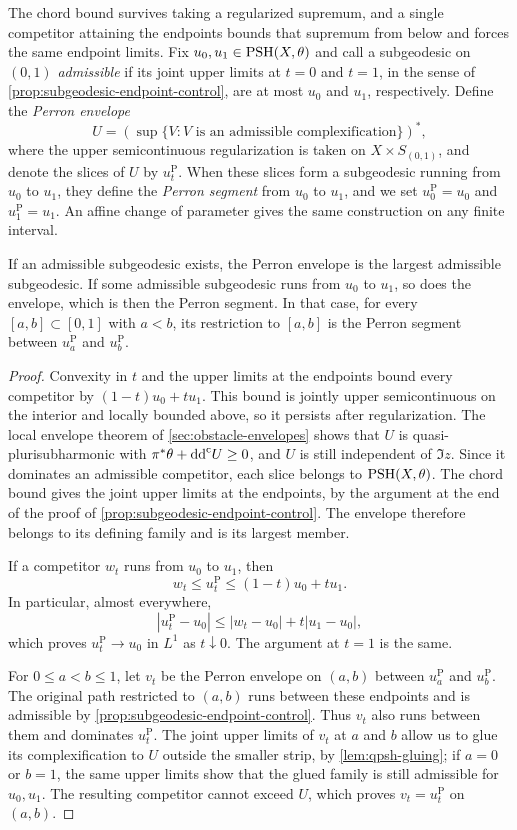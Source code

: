 The chord bound survives taking a regularized supremum, and a single competitor attaining the endpoints bounds that supremum from below and forces the same endpoint limits. Fix $u_0,u_1\in\mathrm{PSH}(X,\theta)$ and call a subgeodesic on $(0,1)$ \emph{admissible} if its joint upper limits at $t=0$ and $t=1$, in the sense of \cref{prop:subgeodesic-endpoint-control}, are at most $u_0$ and $u_1$, respectively. Define the \emph{Perron envelope}
\[
 U=\left(\sup\{V:V\text{ is an admissible complexification}\}\right)^*,
\]
where the upper semicontinuous regularization is taken on $X\times S_{(0,1)}$, and denote the slices of $U$ by $u_t^{\mathrm P}$. When these slices form a subgeodesic running from $u_0$ to $u_1$, they define the \emph{Perron segment} from $u_0$ to $u_1$, and we set $u_0^{\mathrm P}=u_0$ and $u_1^{\mathrm P}=u_1$. An affine change of parameter gives the same construction on any finite interval.

\begin{proposition}\label{prop:hermitian-perron}
If an admissible subgeodesic exists, the Perron envelope is the largest admissible subgeodesic. If some admissible subgeodesic runs from $u_0$ to $u_1$, so does the envelope, which is then the Perron segment. In that case, for every $[a,b]\subset[0,1]$ with $a<b$, its restriction to $[a,b]$ is the Perron segment between $u_a^{\mathrm P}$ and $u_b^{\mathrm P}$.
\end{proposition}
\begin{proof}
Convexity in $t$ and the upper limits at the endpoints bound every competitor by $(1-t)u_0+t u_1$. This bound is jointly upper semicontinuous on the interior and locally bounded above, so it persists after regularization. The local envelope theorem of \cref{sec:obstacle-envelopes} shows that $U$ is quasi-plurisubharmonic with $\pi^*\theta+\mathrm{dd}^{\mathrm{c}} U\geq0$, and $U$ is still independent of $\Im z$. Since it dominates an admissible competitor, each slice belongs to $\mathrm{PSH}(X,\theta)$. The chord bound gives the joint upper limits at the endpoints, by the argument at the end of the proof of \cref{prop:subgeodesic-endpoint-control}. The envelope therefore belongs to its defining family and is its largest member.

If a competitor $w_t$ runs from $u_0$ to $u_1$, then
\[
 w_t\leq u_t^{\mathrm P}\leq(1-t)u_0+t u_1.
\]
In particular, almost everywhere,
\[
 |u_t^{\mathrm P}-u_0|\leq |w_t-u_0|+t|u_1-u_0|,
\]
which proves $u_t^{\mathrm P}\to u_0$ in $L^1$ as $t\downarrow0$. The argument at $t=1$ is the same.

For $0\leq a<b\leq1$, let $v_t$ be the Perron envelope on $(a,b)$ between $u_a^{\mathrm P}$ and $u_b^{\mathrm P}$. The original path restricted to $(a,b)$ runs between these endpoints and is admissible by \cref{prop:subgeodesic-endpoint-control}. Thus $v_t$ also runs between them and dominates $u_t^{\mathrm P}$. The joint upper limits of $v_t$ at $a$ and $b$ allow us to glue its complexification to $U$ outside the smaller strip, by \cref{lem:qpsh-gluing}; if $a=0$ or $b=1$, the same upper limits show that the glued family is still admissible for $u_0,u_1$. The resulting competitor cannot exceed $U$, which proves $v_t=u_t^{\mathrm P}$ on $(a,b)$.
\end{proof}

